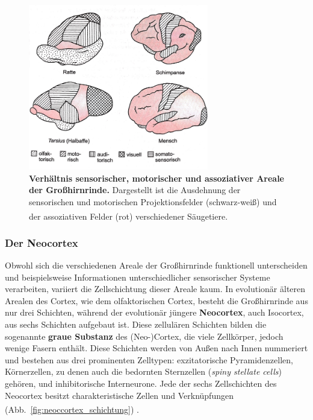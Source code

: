 \documentclass[12pt,a4paper,pdftex]{article}
\begin{document}
\begin{figure}[H]
    \centering
    \includegraphics[width=0.7\textwidth]{pictures/Bilder_Jule/Andere/grosshirnrinde_vgl.png}
    \caption[Verhältnis sensorischer, motorischer und assoziativer Areale der Großhirnrinde.]{\textbf{Verhältnis sensorischer, motorischer und assoziativer Areale der Großhirnrinde.} Dargestellt ist die Ausdehnung der sensorischen und motorischen Projektionsfelder (schwarz-weiß) und der assoziativen Felder (rot) verschiedener Säugetiere. \textsuperscript{\cite[14]{penzlin2005tierphys}}}
    \label{fig:grosshinrinde_vgl}
\end{figure}{}

\subsubsection*{Der Neocortex} 

Obwohl sich die verschiedenen Areale der Großhirnrinde funktionell unterscheiden und beispielsweise Informationen unterschiedlicher sensorischer Systeme verarbeiten, variiert die Zellschichtung dieser Areale kaum. In evolutionär älteren Arealen des Cortex, wie dem olfaktorischen Cortex, besteht die Großhirnrinde aus nur drei Schichten, während der evolutionär jüngere \textbf{Neocortex}, auch Isocortex, aus sechs Schichten aufgebaut ist. Diese zellulären Schichten bilden die sogenannte \textbf{graue Substanz} des (Neo-)Cortex, die viele Zellkörper, jedoch wenige Fasern enthält. Diese Schichten werden von Außen nach Innen nummeriert und bestehen aus drei prominenten Zelltypen: exzitatorische Pyramidenzellen, Körnerzellen, zu denen auch die bedornten Sternzellen (\textit{spiny stellate cells}) gehören, und inhibitorische Interneurone. Jede der sechs Zellschichten des Neocortex besitzt charakteristische Zellen und  Verknüpfungen (Abb.~\ref{fig:neoccortex_schichtung}) \textsuperscript{\cite[7]{watson2010thebrain}}. 
\end{document}
